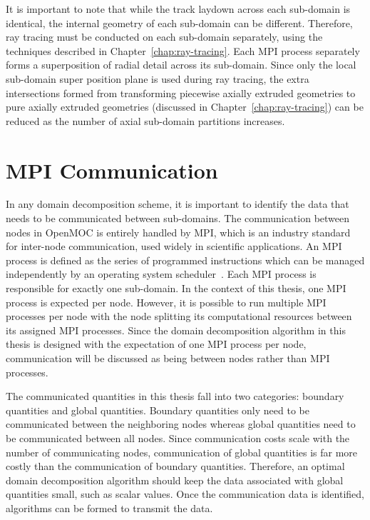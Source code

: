 It is important to note that while the track laydown across each sub-domain is identical, the internal geometry of each sub-domain can be different. Therefore, ray tracing must be conducted on each sub-domain separately, using the techniques described in Chapter~\ref{chap:ray-tracing}. Each \ac{MPI} process separately forms a superposition of radial detail across its sub-domain. Since only the local sub-domain super position plane is used during ray tracing, the extra intersections formed from transforming piecewise axially extruded geometries to pure axially extruded geometries (discussed in Chapter~\ref{chap:ray-tracing}) can be reduced as the number of axial sub-domain partitions increases.

\section{MPI Communication}
\label{sec:mpi}

In any domain decomposition scheme, it is important to identify the data that needs to be communicated between sub-domains. The communication between nodes in OpenMOC is entirely handled by \ac{MPI}, which is an industry standard for inter-node communication, used widely in scientific applications. An \ac{MPI} process is defined as the series of programmed instructions which can be managed independently by an operating system scheduler~\cite{lamport}. Each \ac{MPI} process is responsible for exactly one sub-domain. In the context of this thesis, one \ac{MPI} process is expected per node. However, it is possible to run multiple \ac{MPI} processes per node with the node splitting its computational resources between its assigned \ac{MPI} processes. Since the domain decomposition algorithm in this thesis is designed with the expectation of one \ac{MPI} process per node, communication will be discussed as being between nodes rather than \ac{MPI} processes.

The communicated quantities in this thesis fall into two categories: boundary quantities and global quantities. Boundary quantities only need to be communicated between the neighboring nodes whereas global quantities need to be communicated between all nodes. Since communication costs scale with the number of communicating nodes, communication of global quantities is far more costly than the communication of boundary quantities. Therefore, an optimal domain decomposition algorithm should keep the data associated with global quantities small, such as scalar values. Once the communication data is identified, algorithms can be formed to transmit the data. 


